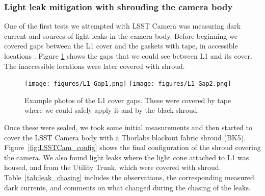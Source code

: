 \subsubsection{Light leak mitigation with shrouding the camera
body}\label{light-leak-mitigation-with-shrouding-the-camera-body}

One of the first tests we attempted with LSST Camera was measuring dark
current and sources of light leaks in the camera body. Before beginning we covered gaps between the L1 cover and the gaskets with tape, in accessible locations . Figure \ref{fig:L1_Gaps} shows the gaps that we could see between L1 and its cover. The inaccessible locations were later covered with shroud.

\begin{figure}[htbp]
\centering
\texttt{[image: figures/L1\_Gap1.png]}
\texttt{[image: figures/L1\_Gap2.png]}
\caption{Example photos of the L1 cover gaps. These were covered by tape where we could safely apply it and by the black shroud.}
\label{fig:L1_Gaps}
\end{figure}

Once these were sealed, we took some initial measurements and then
started to cover the LSST Camera body with a Thorlabs blackout fabric shroud (BK5). Figure~\ref{fig:LSSTCam_config} shows the final configuration of the shroud covering the
camera.
We also found light leaks where the light cone attached to L1 was housed, and from the Utility Trunk, which were covered with shroud. Table~\ref{tab:leak_chasing} includes the observations, the corresponding measured dark currents, and comments on what changed during the chasing of the leaks.

